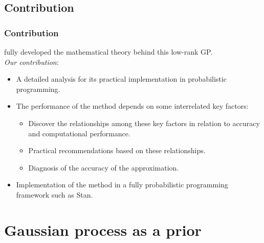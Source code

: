 \documentclass[8pt]{beamer} %
\begin{document}
\subsection*{Contribution}
\begin{frame}
\frametitle{\normalsize Contribution}

{\color{darkgray} \cite{solin2018hilbert} fully developed the mathematical theory behind this {\color{darkgray} low-rank GP}}. \\[4mm]

{\small \textit{\color{darkgray} Our contribution}:}\vspace{-2mm}
\begin{itemize}\setlength\itemsep{3mm}
\item A detailed analysis for its practical implementation in probabilistic programming.

\item The performance of the method depends on some interrelated key factors:\\[2mm]
	\begin{itemize}\setlength\itemsep{1mm}
	\normalsize
	\item {\color{navyblue} Discover the relationships} among these key factors in relation to accuracy and computational performance.
	\item {\color{navyblue} Practical recommendations} based on these relationships. %
	\item {\color{navyblue} Diagnosis} of the accuracy of the approximation.
	\end{itemize}

\item Implementation of the method in a fully probabilistic programming framework such as Stan.
\end{itemize}
\end{frame}


\section{Gaussian process as a prior}
\end{document}
